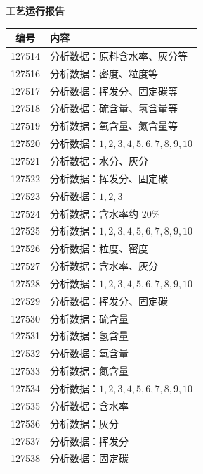 \documentclass[UTF8,10pt,a4paper,fontset=fandol]{ctexart}
\begin{document}

\newpage

\begin{center}
\begin{minipage}[t]{0.47\textwidth}
\centering
\textbf{工艺运行报告}

\smallskip
\begin{tabularx}{\linewidth}{|c|X|}
\hline
\textbf{编号} & \textbf{内容} \\ \hline
127514 & 分析数据：原料含水率、灰分等 \\ \hline
127516 & 分析数据：密度、粒度等 \\ \hline
127517 & 分析数据：挥发分、固定碳等 \\ \hline
127518 & 分析数据：硫含量、氢含量等 \\ \hline
127519 & 分析数据：氧含量、氮含量等 \\ \hline
127520 & 分析数据：$1,2,3,4,5,6,7,8,9,10$ \\ \hline
127521 & 分析数据：水分、灰分 \\ \hline
127522 & 分析数据：挥发分、固定碳 \\ \hline
127523 & 分析数据：$1,2,3$ \\ \hline
127524 & 分析数据：含水率约 $20\%$ \\ \hline
127525 & 分析数据：$1,2,3,4,5,6,7,8,9,10$ \\ \hline
127526 & 分析数据：粒度、密度 \\ \hline
127527 & 分析数据：含水率、灰分 \\ \hline
127528 & 分析数据：$1,2,3,4,5,6,7,8,9,10$ \\ \hline
127529 & 分析数据：挥发分、固定碳 \\ \hline
127530 & 分析数据：硫含量 \\ \hline
127531 & 分析数据：氢含量 \\ \hline
127532 & 分析数据：氧含量 \\ \hline
127533 & 分析数据：氮含量 \\ \hline
127534 & 分析数据：$1,2,3,4,5,6,7,8,9,10$ \\ \hline
127535 & 分析数据：含水率 \\ \hline
127536 & 分析数据：灰分 \\ \hline
127537 & 分析数据：挥发分 \\ \hline
127538 & 分析数据：固定碳 \\ \hline
\end{tabularx}


\end{minipage}
\end{center}
\end{document}
